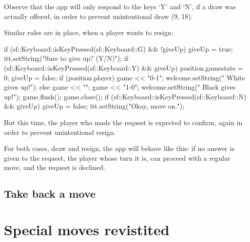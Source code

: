 Observe that the app will only respond to the keys `Y' and `N', if a draw was actually offered,
in order to prevent unintentional draw (9, 18).

Similar rules are in place, when a player wants to resign:

\begin{cpp}
if (sf::Keyboard::isKeyPressed(sf::Keyboard::G) && !giveUp) {
  giveUp = true;
  itt.setString("Sure to give up? (Y/N)");
}
if (sf::Keyboard::isKeyPressed(sf::Keyboard::Y) && giveUp) {
  position.gamestate = 0;
  giveUp = false;
  if (position.player) {
    game << "0-1\n";
    welcome.setString("    White gives up!\n");
  } else {
    game << "\n";
    game << "1-0\n";
    welcome.setString("    Black gives up!\n");
  }
  game.flush();
  game.close();
}
if (sf::Keyboard::isKeyPressed(sf::Keyboard::N) && giveUp) {
  giveUp = false;
  itt.setString("Okay, move on.");
}
\end{cpp}

But this time, the player who made the request is expected to confirm, again in order to
prevent unintentional resign.

For both cases, draw and resign, the app will behave like this: if no answer is given to
the request, the player whose turn it is, can proceed with a regular move, and the request
is declined.

\subsection{Take back a move}


\section{Special moves revistited}


